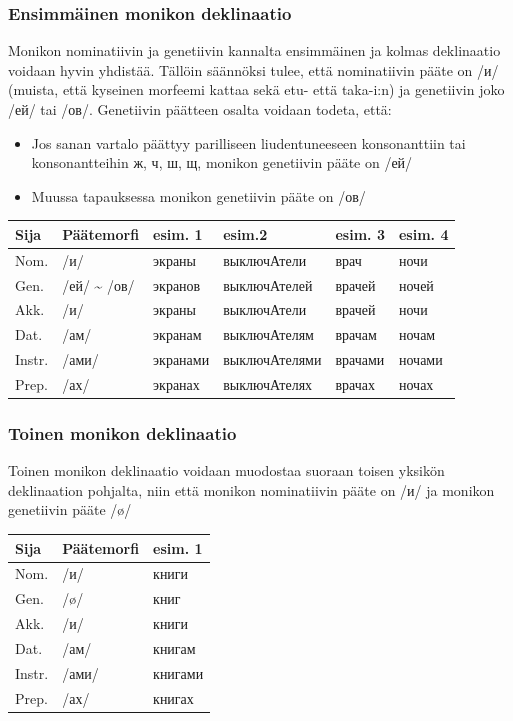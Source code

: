 \documentclass[]{scrreprt}
\providecommand{\tightlist}{%
  \setlength{\itemsep}{0pt}\setlength{\parskip}{0pt}}
\begin{document}
\subsubsection{Ensimmäinen monikon
deklinaatio}\label{ensimmuxe4inen-monikon-deklinaatio}

Monikon nominatiivin ja genetiivin kannalta ensimmäinen ja kolmas
deklinaatio voidaan hyvin yhdistää. Tällöin säännöksi tulee, että
nominatiivin pääte on /и/ (muista, että kyseinen morfeemi kattaa sekä
etu- että taka-i:n) ja genetiivin joko /ей/ tai /ов/. Genetiivin
päätteen osalta voidaan todeta, että:

\begin{itemize}
\tightlist
\item
  Jos sanan vartalo päättyy parilliseen liudentuneeseen konsonanttiin
  tai konsonantteihin ж, ч, ш, щ, monikon genetiivin pääte on /ей/
\item
  Muussa tapauksessa monikon genetiivin pääte on /ов/
\end{itemize}

\begin{longtable}[c]{@{}llllll@{}}
\toprule
Sija & Päätemorfi & esim. 1 & esim.2 & esim. 3 & esim. 4\tabularnewline
\midrule
\endhead
Nom. & /и/ & экраны & выключАтели & врач & ночи\tabularnewline
Gen. & /ей/ \textasciitilde{} /ов/ & экранов & выключАтелей & врачей &
ночей\tabularnewline
Akk. & /и/ & экраны & выключАтели & врачей & ночи\tabularnewline
Dat. & /ам/ & экранам & выключАтелям & врачам & ночам\tabularnewline
Instr. & /ами/ & экранами & выключАтелями & врачами &
ночами\tabularnewline
Prep. & /ах/ & экранах & выключАтелях & врачах & ночах\tabularnewline
\bottomrule
\end{longtable}

\subsubsection{Toinen monikon deklinaatio}\label{toinen-monikon-deklinaatio}

Toinen monikon deklinaatio voidaan muodostaa suoraan toisen yksikön
deklinaation pohjalta, niin että monikon nominatiivin pääte on /и/ ja
monikon genetiivin pääte /ø/

\begin{longtable}[c]{@{}lll@{}}
\toprule
Sija & Päätemorfi & esim. 1\tabularnewline
\midrule
\endhead
Nom. & /и/ & книги\tabularnewline
Gen. & /ø/ & книг\tabularnewline
Akk. & /и/ & книги\tabularnewline
Dat. & /ам/ & книгам\tabularnewline
Instr. & /ами/ & книгами\tabularnewline
Prep. & /ах/ & книгах\tabularnewline
\bottomrule
\end{longtable}
\end{document}
